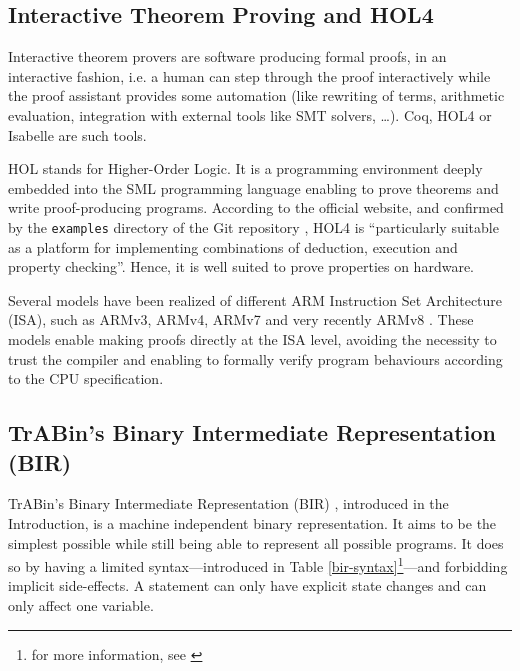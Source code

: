 \documentclass{kththesis}
\begin{document}
\subsection{Interactive Theorem Proving and HOL4}

Interactive theorem provers are software producing formal proofs, in an
interactive fashion, i.e. a human can step through the proof interactively while
the proof assistant provides some automation (like rewriting of terms,
arithmetic evaluation, integration with external tools like SMT solvers, \dots).
Coq, HOL4 or Isabelle are such tools.

HOL \cite{noauthor_hol_nodate} stands for Higher-Order Logic. It is a
programming environment deeply embedded into the SML programming language
enabling to prove theorems and write proof-producing programs. According to the
official website, and confirmed by the \texttt{examples} directory of the Git
repository \cite{noauthor_canonical_2019}, HOL4 is ``particularly suitable as a
platform for implementing combinations of deduction, execution and property
checking''. Hence, it is well suited to prove properties on hardware.

Several models have been realized of different ARM Instruction Set Architecture
(ISA), such as ARMv3, ARMv4, ARMv7 \cite{noauthor_canonical_2019,
	hutchison_trustworthy_2010} and very recently ARMv8 \cite{armstrong_isa_2019}.
These models enable making proofs directly at the ISA level, avoiding the
necessity to trust the compiler and enabling to formally verify program
behaviours according to the CPU specification.

\subsection{TrABin's Binary Intermediate Representation (BIR)}

TrABin's Binary Intermediate Representation (BIR) \cite{lindner_trabin:_2019},
introduced in the Introduction, is a machine independent binary representation.
It aims to be the simplest possible while still being able to represent all
possible programs. It does so by having a limited syntax---introduced in Table
\ref{bir-syntax}\footnote{for more information, see
	\cite{lindner_trabin:_2019}}---and forbidding implicit side-effects. A statement
can only have explicit state changes and can only affect one variable.
\end{document}
